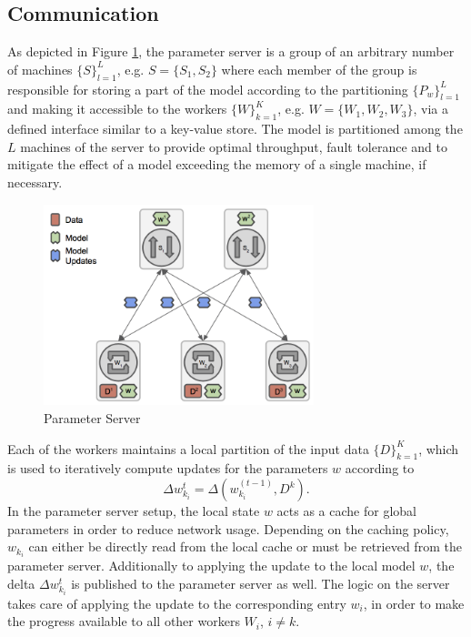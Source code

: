 \subsection{Communication}
As depicted in Figure \ref{fig:param_server}, the parameter server is a group of an arbitrary number of machines $\{S\}_{l=1}^L$, e.g. $S = \{S_1, S_2\}$ where each member of the group is responsible for storing a part of the model according to the partitioning $\{P_w\}_{l=1}^L$ and making it accessible to the workers $\{W\}_{k=1}^K$, e.g. $W = \{W_1, W_2, W_3\}$, via a defined interface similar to a key-value store.
The model is partitioned among the $L$ machines of the server to provide optimal throughput, fault tolerance and to mitigate the effect of a model exceeding the memory of a single machine, if necessary.
\begin{figure}[ht]
\centering
\includegraphics[width=0.7\textwidth]{img/param_server.png}
\caption{Parameter Server}
\label{fig:param_server}
\end{figure}
Each of the workers maintains a local partition of the input data $\{D\}_{k=1}^K$, which is used to iteratively compute updates for the parameters $w$ according to
\begin{equation}
\Delta w_{k_i}^{t} = \Delta(w_{k_i}^{(t-1)},D^k).
\label{eqn:local_delta_upd_param}
\end{equation}
In the parameter server setup, the local state $w$ acts as a cache for global parameters in order to reduce network usage.
Depending on the caching policy, $w_{k_i}$ can either be directly read from the local cache or must be retrieved from the parameter server.
Additionally to applying the update to the local model $w$, the delta $\Delta w_{k_i}^{t}$ is published to the parameter server as well.
The logic on the server takes care of applying the update to the corresponding entry $w_i$, in order to make the progress available to all other workers $W_i$, $i \neq k$.
